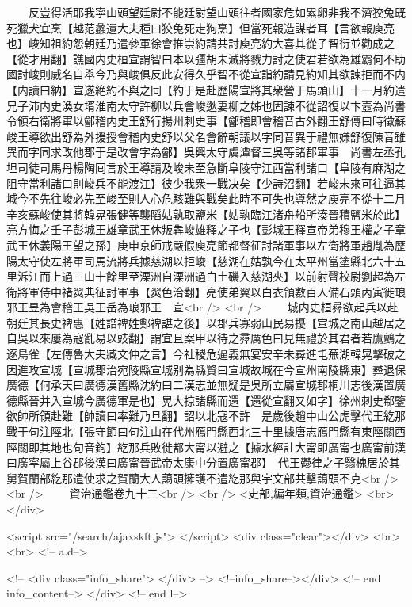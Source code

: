 　　反豈得活耶我寜山頭望廷尉不能廷尉望山頭往者國家危如累卵非我不濟狡兔既死獵犬宜烹【越范蠡遺大夫種曰狡兔死走狗烹】但當死報造謀者耳【言欲報庾亮也】峻知祖約怨朝廷乃遣參軍徐會推崇約請共討庾亮約大喜其從子智衍並勸成之【從才用翻】譙國内史桓宣謂智曰本以彊胡未滅將戮力討之使君若欲為雄霸何不助國討峻則威名自舉今乃與峻俱反此安得久乎智不從宣詣約請見約知其欲諫拒而不内【内讀曰納】宣遂絶約不與之同【約于是赴歷陽宣將其衆營于馬頭山】十一月約遣兄子沛内史渙女壻淮南太守許柳以兵會峻逖妻柳之姊也固諫不從詔復以卞壼為尚書令領右衛將軍以鄶稽内史王舒行揚州刺史事【鄶稽即會稽音古外翻王舒傳曰時徵蘇峻王導欲出舒為外援授會稽内史舒以父名會辭朝議以字同音異于禮無嫌舒復陳音雖異而字同求改他郡于是改會字為鄶】吳興太守虞潭督三吳等諸郡軍事　尚書左丞孔坦司徒司馬丹楊陶囘言於王導請及峻未至急斷阜陵守江西當利諸口【阜陵有麻湖之阻守當利諸口則峻兵不能渡江】彼少我衆一戰决矣【少詩沼翻】若峻未來可往逼其城今不先往峻必先至峻至則人心危駭難與戰矣此時不可失也導然之庾亮不從十二月辛亥蘇峻使其將韓晃張健等襲䧟姑孰取鹽米【姑孰臨江渚舟船所湊晉積鹽米於此】亮方悔之壬子彭城王雄章武王休叛犇峻雄釋之子也【彭城王釋宣帝弟穆王權之子章武王休義陽王望之孫】庚申京師戒嚴假庾亮節都督征討諸軍事以左衛將軍趙胤為歷陽太守使左將軍司馬流將兵據慈湖以拒峻【慈湖在姑孰今在太平州當塗縣北六十五里泝江而上過三山十餘里至溧洲自溧洲過白土磯入慈湖夾】以前射聲校尉劉超為左衛將軍侍中禇翜典征討軍事【翜色洽翻】亮使弟翼以白衣領數百人備石頭丙寅徙琅邪王昱為會稽王吳王岳為琅邪王　宣<br />
<br />
　　城内史桓彛欲起兵以赴朝廷其長史禆惠【姓譜禆姓鄭禆諶之後】以郡兵寡弱山民易擾【宣城之南山越居之自吳以來屢為寇亂易以豉翻】謂宜且案甲以待之彛厲色曰見無禮於其君者若鷹鸇之逐鳥雀【左傳魯大夫臧文仲之言】今社稷危逼義無宴安辛未彛進屯蕪湖韓晃擊破之因進攻宣城【宣城郡治宛陵縣宣城别為縣賢曰宣城故城在今宣州南陵縣東】彛退保廣德【何承天曰廣德漢舊縣沈約曰二漢志並無疑是吳所立屬宣城郡桐川志後漢置廣德縣晉并入宣城今廣德軍是也】晃大掠諸縣而還【還從宣翻又如字】徐州刺史郗鑒欲帥所領赴難【帥讀曰率難乃旦翻】詔以北寇不許　是歲後趙中山公虎擊代王紇那戰于句注陘北【張守節曰句注山在代州鴈門縣西北三十里據唐志鴈門縣有東陘關西陘關即其地也句音鉤】紇那兵敗徙都大甯以避之【據水經註大甯即廣甯也廣甯前漢曰廣寜屬上谷郡後漢曰廣甯晉武帝太康中分置廣甯郡】　代王鬱律之子翳槐居於其舅賀蘭部紇那遣使求之賀蘭大人藹頭擁護不遣紇那與宇文部共擊藹頭不克<br />
<br />
　　資治通鑑卷九十三<br />
<br />
<史部,編年類,資治通鑑>  <br>
   </div> 

<script src="/search/ajaxskft.js"> </script>
 <div class="clear"></div>
<br>
<br>
 <!-- a.d-->

 <!--
<div class="info_share">
</div> 
-->
 <!--info_share--></div>   <!-- end info_content-->
  </div> <!-- end l-->

